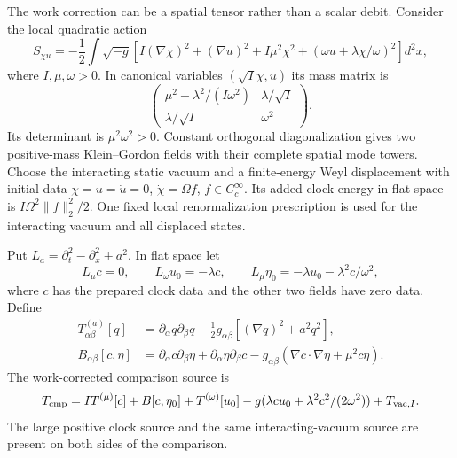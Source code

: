 The work correction can be a spatial tensor rather than a scalar debit.
Consider the local quadratic action
\begin{equation}
 S_{\chi u}=-\frac12\int\sqrt{-g}\left[
 I(\nabla\chi)^2+(\nabla u)^2+I\mu^2\chi^2+
                      (\omega u+\lambda\chi/\omega)^2\right]d^2x,
 \label{eq:spatial-clock-action}
\end{equation}
where $I,\mu,\omega>0$. In canonical variables $(\sqrt I\chi,u)$
its mass matrix is
\[
 \begin{pmatrix}\mu^2+\lambda^2/(I\omega^2)&\lambda/\sqrt I\\
                 \lambda/\sqrt I&\omega^2\end{pmatrix}.
\]
Its determinant is $\mu^2\omega^2>0$. Constant orthogonal
diagonalization gives two positive-mass Klein--Gordon fields with
their complete spatial mode towers. Choose the interacting static
vacuum and a finite-energy Weyl displacement with initial data
$\chi=u=\dot u=0$, $\dot\chi=\Omega f$,
$f\in C_c^\infty$. Its added clock energy in flat space is
$I\Omega^2\|f\|_2^2/2$. One fixed local renormalization prescription
is used for the interacting vacuum and all displaced states.

Put $L_a=\partial_t^2-\partial_x^2+a^2$. In flat space let
\begin{equation}
 L_\mu c=0,\qquad L_\omega u_0=-\lambda c,\qquad
 L_\mu\eta_0=-\lambda u_0-\lambda^2c/\omega^2,
 \label{eq:spatial-retarded-work}
\end{equation}
where $c$ has the prepared clock data and the other two fields have
zero data. Define
\begin{align}
 T^{(a)}_{\alpha\beta}[q]
  &=\partial_\alpha q\partial_\beta q-\tfrac12g_{\alpha\beta}
                         [(\nabla q)^2+a^2q^2],\\
 B_{\alpha\beta}[c,\eta]
  &=\partial_\alpha c\partial_\beta\eta+
    \partial_\alpha\eta\partial_\beta c
      -g_{\alpha\beta}(\nabla c\cdot\nabla\eta+\mu^2c\eta).
\end{align}
The work-corrected comparison source is
\begin{equation}
 T_{\rm cmp}=I T^{(\mu)}[c]+B[c,\eta_0]+T^{(\omega)}[u_0]
       -g(\lambda c u_0+\lambda^2c^2/(2\omega^2))+T_{{\rm vac},I}.
 \label{eq:spatial-comparison}
\end{equation}
The large positive clock source and the same interacting-vacuum
source are present on both sides of the comparison.

